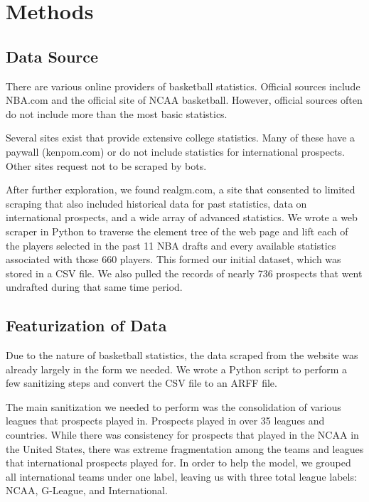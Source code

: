 \documentclass{article}
\begin{document}
\section{Methods}

\subsection{Data Source}

There are various online providers of basketball statistics. Official sources
include NBA.com and the official site of NCAA basketball. However, official
sources often do not include more than the most basic statistics.

Several sites exist that provide extensive college statistics. Many of these
have a paywall (kenpom.com) or do not include statistics for international
prospects. Other sites request not to be scraped by bots.

After further exploration, we found realgm.com, a site that consented to limited
scraping that also included historical data for past statistics, data on
international prospects, and a wide array of advanced statistics. We wrote a web
scraper in Python to traverse the element tree of the web page and lift each of
the players selected in the past 11 NBA drafts and every available statistics
associated with those 660 players. This formed our initial dataset, which was
stored in a CSV file. We also pulled the records of nearly 736 prospects that
went undrafted during that same time period. 

\subsection{Featurization of Data}

Due to the nature of basketball statistics, the data scraped from the website
was already largely in the form we needed. We wrote a Python script to perform a
few sanitizing steps and convert the CSV file to an ARFF file.

The main sanitization we needed to perform was the consolidation of various
leagues that prospects played in. Prospects played in over 35 leagues and
countries. While there was consistency for prospects that played in the NCAA in
the United States, there was extreme fragmentation among the teams and leagues
that international prospects played for. In order to help the model, we grouped
all international teams under one label, leaving us with three total league
labels: NCAA, G-League, and International.
\end{document}
